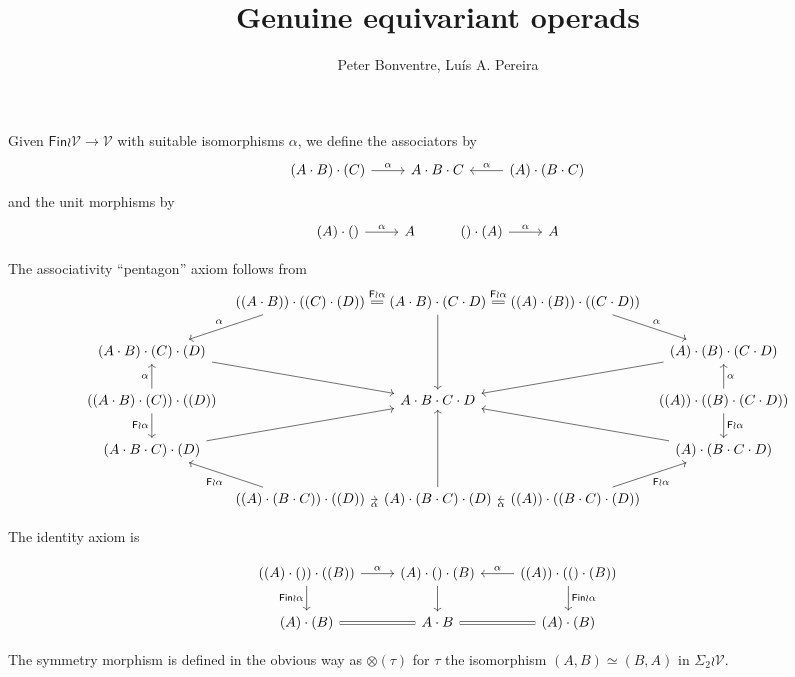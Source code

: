 \documentclass[a4paper,10pt]{article}%
\author{Peter Bonventre, Lu\'is A. Pereira}%
\title{Genuine equivariant operads}%
\begin{document}
	\maketitle%

Given 
$\mathsf{Fin} \wr \mathcal{V} \to \mathcal{V}$ with suitable isomorphisms $\alpha$, we define the associators by
\[
\begin{tikzcd}
	(A \cdot B) \cdot (C) \ar{r}{\alpha} &
	A \cdot B \cdot C &
	(A) \cdot (B \cdot C) \ar{l}[swap]{\alpha}
\end{tikzcd}
\]
and the unit morphisms by
\[
\begin{tikzcd}
	(A) \cdot () \ar{r}{\alpha} &
	A &
	() \cdot (A) \ar{r}{\alpha} &
	A
\end{tikzcd}
\]

The associativity ``pentagon'' axiom follows from
\[
\begin{tikzcd}[column sep=5pt]
	&
	((A \cdot B)) \cdot ((C) \cdot (D)) 
	\ar[equal]{r}{\mathsf{F} \wr \alpha} \ar{ld}[swap]{\alpha} &
	(A \cdot B) \cdot (C \cdot D) \ar{dd} &
	((A) \cdot (B)) \cdot ((C \cdot D)) 
	\ar[equal]{l}[swap]{\mathsf{F} \wr \alpha} \ar{rd}{\alpha}
\\
	(A \cdot B) \cdot (C) \cdot (D) \ar{rrd} & 
	&
	&
	&
	(A) \cdot (B) \cdot (C \cdot D)\ar{lld}
\\
	((A \cdot B) \cdot (C)) \cdot ((D)) \ar{u}{\alpha}
	\ar{d}[swap]{\mathsf{F} \wr \alpha}& 
	&
	A \cdot B \cdot C \cdot D
	&
	&
	((A)) \cdot ((B) \cdot (C \cdot D)) \ar{u}[swap]{\alpha} \ar{d}{\mathsf{F} \wr \alpha}
\\
	(A \cdot B \cdot C) \cdot (D) \ar{rru} &
	&
	&
	&
	(A) \cdot (B \cdot C \cdot D) \ar{llu}
\\
	&
	((A) \cdot (B \cdot C))\cdot ((D)) \ar{r}[swap]{\alpha} \ar{lu}{\mathsf{F} \wr \alpha} &
	(A) \cdot (B \cdot C) \cdot (D) \ar{uu} &
	((A)) \cdot ((B \cdot C) \cdot (D)) \ar{l}{\alpha} 
	\ar{ru}[swap]{\mathsf{F} \wr \alpha}
\end{tikzcd}
\]

The identity axiom is

\[
\begin{tikzcd}
	((A) \cdot ()) \cdot ((B)) \ar{r}{\alpha} \ar{d}[swap]{\mathsf{Fin} \wr \alpha} &
	(A) \cdot () \cdot (B) \ar{d} &
	((A)) \cdot (() \cdot (B)) \ar{l}[swap]{\alpha}
	\ar{d}{\mathsf{Fin} \wr \alpha}
\\
	(A) \cdot (B) \ar[equal]{r}&
	A \cdot B &
	(A) \cdot (B) \ar[equal]{l}
\end{tikzcd}
\]

The symmetry morphism is defined in the obvious way as 
$\otimes (\tau)$ for $\tau$ the 
isomorphism
$(A,B) \simeq (B,A)$ in $\Sigma_2 \wr \mathcal{V}$.
\end{document}
